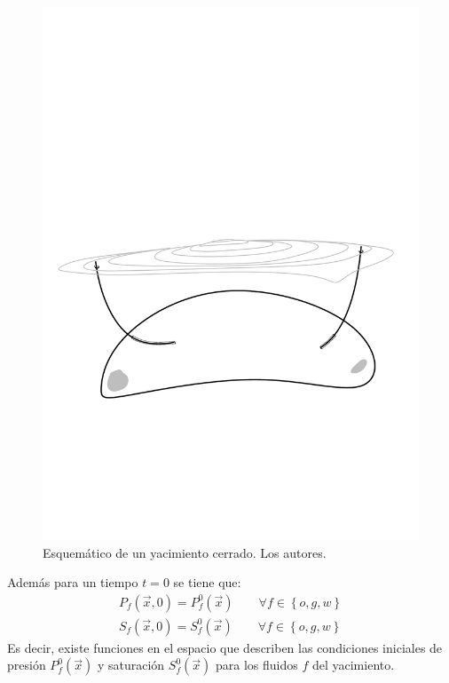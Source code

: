 \begin{figure}[h]
	\centering%
	\includegraphics[scale=0.8]{Fig/yacimiento.pdf}%
	\caption[Esquemático de un yacimiento cerrado.]{Esquemático de un yacimiento cerrado. Los autores.}
	\label{fig:empanada}
\end{figure}

Además para un tiempo $t=0$ se tiene que:
\begin{align}
	P_{f}(\vec{x},0) = P^{0}_{f}(\vec{x}) \qquad \forall f \in \left\lbrace o,g,w\right\rbrace\\
	S_{f}(\vec{x},0) = S^{0}_{f}(\vec{x}) \qquad \forall f \in \left\lbrace o,g,w\right\rbrace
\end{align}
%
Es decir, existe funciones en el espacio que describen las condiciones iniciales de presión $P^{0}_{f}(\vec{x})$ y saturación $S^{0}_{f}(\vec{x})$ para los fluidos $f$ del yacimiento.

